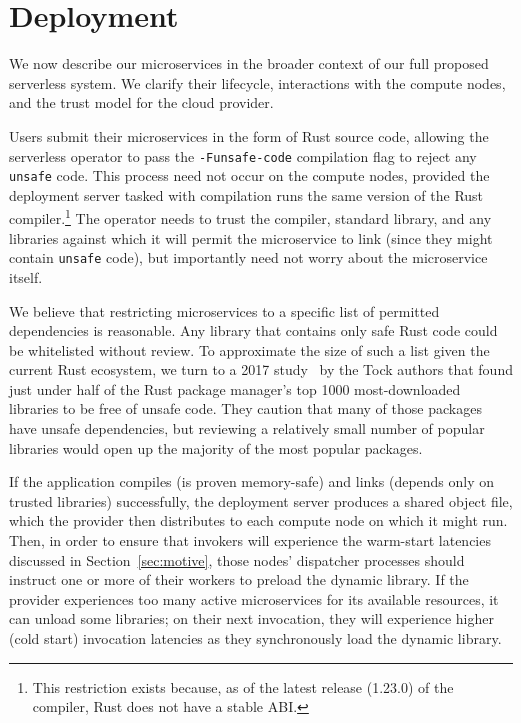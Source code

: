 \section{Deployment}
\label{sec:deploy}

We now describe our microservices in the broader context of our full proposed
serverless system.  We clarify their lifecycle, interactions with the compute nodes,
and the trust model for the cloud provider.

Users submit their microservices in the form of Rust source code, allowing the
serverless operator to pass the \texttt{-Funsafe-code} compilation flag to reject
any \texttt{unsafe} code.  This process need not occur on the compute
nodes, provided the deployment server tasked with compilation runs the same version
of the Rust compiler.\footnote{This restriction exists because, as of the latest
release (1.23.0) of the compiler, Rust does not have a stable ABI.}  The operator
needs to trust the compiler, standard library, and any libraries against which it
will permit the microservice to link (since they might contain \texttt{unsafe} code),
but importantly need not worry about the microservice itself.

We believe that restricting microservices to a specific
list of permitted dependencies is reasonable.  Any library that contains only
safe Rust code could be whitelisted without review.  To approximate the size of such
a list given the current Rust ecosystem, we turn to a 2017
study~\cite{www-cratesio-unsafe} by the Tock authors that found just under half of
the Rust package manager's top 1000 most-downloaded libraries to be free of
unsafe code.  They caution that many of those packages have unsafe
dependencies, but reviewing a relatively small number of popular
libraries would open up the majority of the most popular packages.

If the application compiles (is proven memory-safe) and links (depends only on
trusted libraries) successfully, the deployment server produces a shared object file,
which the provider then distributes to each compute node on which it might run.
Then, in order to ensure that invokers will experience the warm-start latencies
discussed in Section~\ref{sec:motive}, those nodes' dispatcher processes should
instruct one or more of their workers to preload the dynamic library.  If the
provider experiences too many active microservices for its available resources, it
can unload some libraries; on their next invocation, they will experience higher
(cold start) invocation latencies as they synchronously load the dynamic library.
